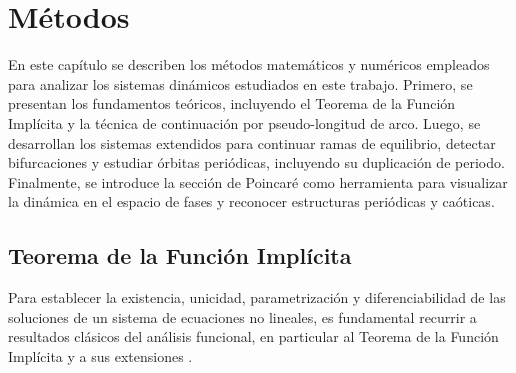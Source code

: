 

\chapter{Métodos}

En este capítulo se describen los métodos matemáticos y numéricos empleados
para analizar los sistemas dinámicos estudiados en este trabajo. Primero,
se presentan los fundamentos teóricos, incluyendo el Teorema de la Función
Implícita y la técnica de continuación por pseudo-longitud de arco. Luego,
se desarrollan los sistemas extendidos para continuar ramas de equilibrio,
detectar bifurcaciones y estudiar órbitas periódicas, incluyendo su
duplicación de periodo. Finalmente, se introduce la sección de Poincaré
como herramienta para visualizar la dinámica en el espacio de fases y
reconocer estructuras periódicas y caóticas.

\section{Teorema de la Función Implícita}

Para establecer la existencia, unicidad, parametrización y diferenciabilidad
de las soluciones de un sistema de ecuaciones no lineales, es fundamental recurrir
a resultados clásicos del análisis funcional, en particular al Teorema de la
Función Implícita y a sus extensiones \cite{Doedel2007}.

